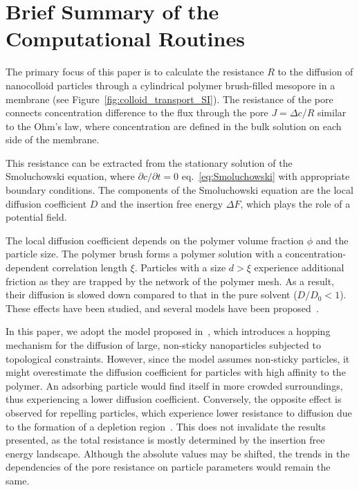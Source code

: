 \documentclass[10pt, a4paper]{article}
\begin{document}
\section{Brief Summary of the Computational Routines}
\begin{multicols}{2}

The primary focus of this paper is to calculate the resistance $R$ to the diffusion of nanocolloid particles through a cylindrical polymer brush-filled mesopore in a membrane (see Figure~\ref{fig:colloid_transport_SI}).
The resistance of the pore connects concentration difference to the flux through the pore $J = \Delta c / R$ similar to the Ohm's law, where concentration are defined in the bulk solution on each side of the membrane.

This resistance can be extracted from the stationary solution of the Smoluchowski equation, where $\partial c/\partial t = 0$ eq.~\ref{eq:Smoluchowski} with appropriate boundary conditions.
The components of the Smoluchowski equation are the local diffusion coefficient $D$ and the insertion free energy $\Delta F$, which plays the role of a potential field.

The local diffusion coefficient depends on the polymer volume fraction $\phi$ and the particle size.
The polymer brush forms a polymer solution with a concentration-dependent correlation length $\xi$.
Particles with a size $d > \xi$ experience additional friction as they are trapped by the network of the polymer mesh.
As a result, their diffusion is slowed down compared to that in the pure solvent ($D/D_0 < 1$).
These effects have been studied, and several models have been proposed~\cite{Kohli2012,Cai2011,Holyst2009,Phillies1988}.

In this paper, we adopt the model proposed in~\cite{Cai2011}, which introduces a hopping mechanism for the diffusion of large, non-sticky nanoparticles subjected to topological constraints.
However, since the model assumes non-sticky particles, it might overestimate the diffusion coefficient for particles with high affinity to the polymer.
An adsorbing particle would find itself in more crowded surroundings, thus experiencing a lower diffusion coefficient.
Conversely, the opposite effect is observed for repelling particles, which experience lower resistance to diffusion due to the formation of a depletion region~\cite{Holyst2011}.
This does not invalidate the results presented, as the total resistance is mostly determined by the insertion free energy landscape.
Although the absolute values may be shifted, the trends in the dependencies of the pore resistance on particle parameters would remain the same.


\end{multicols}
\end{document}
